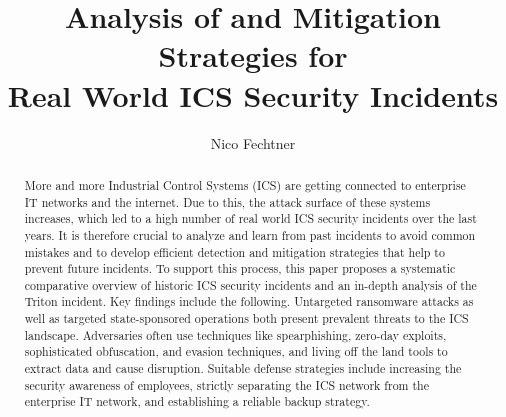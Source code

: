 \documentclass[runningheads]{llncs}
\begin{document}
%
\title{Analysis of and Mitigation Strategies for \\Real World ICS Security Incidents}
%
%
\author{Nico Fechtner}
%
%
%
\maketitle              %
%
\begin{abstract}
More and more Industrial Control Systems (ICS) are getting connected to enterprise IT networks and the internet.
Due to this, the attack surface of these systems increases, which led to a high number of real world ICS security incidents over the last years.
It is therefore crucial to analyze and learn from past incidents to avoid common mistakes and to develop efficient detection and mitigation strategies that help to prevent future incidents.
To support this process, this paper proposes a systematic comparative overview of historic ICS security incidents and an in-depth analysis of the Triton incident.
Key findings include the following.
Untargeted ransomware attacks as well as targeted state-sponsored operations both present prevalent threats to the ICS landscape.
Adversaries often use techniques like spearphishing, zero-day exploits, sophisticated obfuscation, and evasion techniques, and living off the land tools to extract data and cause disruption.
Suitable defense strategies include increasing the security awareness of employees, strictly separating the ICS network from the enterprise IT network, and establishing a reliable backup strategy.

\end{abstract}
%
%
%
\end{document}

